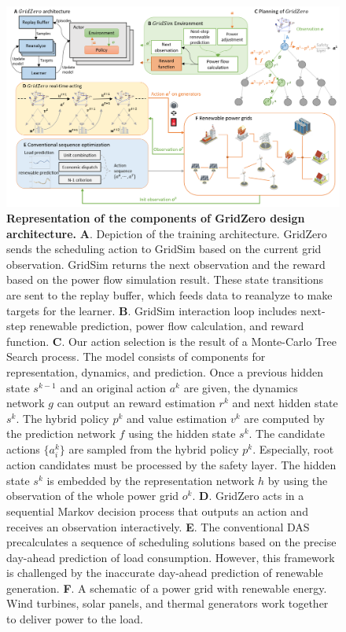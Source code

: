 
\begin{figure}[h]
  \centering
  \includegraphics[width=0.85\linewidth]{fig/nature_fig1.png}
  \caption{\textbf{Representation of the components of GridZero design architecture.}
  \textbf{A}. Depiction of the training architecture. GridZero sends the scheduling action to GridSim based on the current grid observation. GridSim returns the next observation and the reward based on the power flow simulation result. These state transitions are sent to the replay buffer, which feeds data to reanalyze to make targets for the learner.
  \textbf{B}. GridSim interaction loop includes next-step renewable prediction, power flow calculation, and reward function.
  \textbf{C}. Our action selection is the result of a Monte-Carlo Tree Search process. The model consists of components for representation, dynamics, and prediction. Once a previous hidden state $s^{k-1}$ and an original action $a^k$ are given, the dynamics network $g$ can output an reward estimation $r^k$ and next hidden state $s^k$. The hybrid policy $p^k$ and value estimation $v^k$ are computed by the prediction network $f$ using the hidden state $s^k$. The candidate actions $\{a^k_i\}$ are sampled from the hybrid policy $p^k$. Especially, root action candidates must be processed by the safety layer. The hidden state $s^k$ is embedded by the representation network $h$ by using the observation of the whole power grid $o^k$.
  \textbf{D}. GridZero acts in a sequential Markov decision process that outputs an action and receives an observation interactively. 
  \textbf{E}. The conventional DAS precalculates a sequence of scheduling solutions based on the precise day-ahead prediction of load consumption. However, this framework is challenged by the inaccurate day-ahead prediction of renewable generation.
  \textbf{F}. A schematic of a power grid with renewable energy. Wind turbines, solar panels, and thermal generators work together to deliver power to the load. 
  } 
  \label{fig:nature_fig1}
\end{figure}

